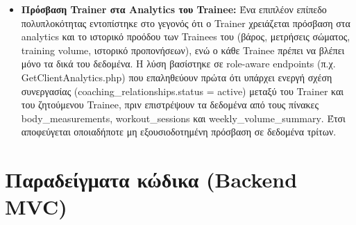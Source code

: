 \documentclass[12pt,a4paper]{report}
\begin{document}
\begin{itemize}
    \item \textbf{Πρόσβαση Trainer στα Analytics του Trainee:} Ένα επιπλέον επίπεδο πολυπλοκότητας εντοπίστηκε στο γεγονός ότι ο \textenglish{Trainer} χρειάζεται πρόσβαση στα \textenglish{analytics} και το ιστορικό προόδου των \textenglish{Trainees} του (βάρος, μετρήσεις σώματος, \textenglish{training volume}, ιστορικό προπονήσεων), ενώ ο κάθε \textenglish{Trainee} πρέπει να βλέπει μόνο τα δικά του δεδομένα. Η λύση βασίστηκε σε \textenglish{role-aware endpoints} (π.χ. \textenglish{GetClientAnalytics.php}) που επαληθεύουν πρώτα ότι υπάρχει ενεργή σχέση συνεργασίας (\textenglish{coaching\_relationships.status = active}) μεταξύ του \textenglish{Trainer} και του ζητούμενου \textenglish{Trainee}, πριν επιστρέψουν τα δεδομένα από τους πίνακες \textenglish{body\_measurements}, \textenglish{workout\_sessions} και \textenglish{weekly\_volume\_summary}. Έτσι αποφεύγεται οποιαδήποτε μη εξουσιοδοτημένη πρόσβαση σε δεδομένα τρίτων.
\end{itemize}

\newpage

\section{Παραδείγματα κώδικα (Backend MVC)}
\end{document}
